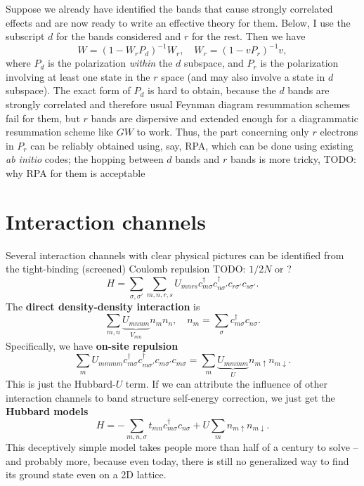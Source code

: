 \documentclass[hyperref, a4paper, 12pt]{report}
\newcommand*{\concept}[1]{{\textbf{#1}}}
\newcommand*{\abinitio}{\textit{ab initio}}
\begin{document}
Suppose we already have identified the bands that cause strongly correlated effects
and are now ready to write an effective theory for them.
Below, I use the subscript $d$ for the bands considered and $r$ for the rest.
Then we have\cite{aryasetiawan20117} 
\begin{equation}
    W = (1 - W_r P_d)^{-1} W_r, \quad 
    W_r = (1 - v P_r)^{-1}v,
\end{equation}
where $P_d$ is the polarization \emph{within} the $d$ subspace,
and $P_r$ is the polarization involving at least one state in the $r$ space 
(and may also involve a state in $d$ subspace).
The exact form of $P_d$ is hard to obtain,
because the $d$ bands are strongly correlated and therefore 
usual Feynman diagram resummation schemes fail for them,
but $r$ bands are dispersive and extended enough 
for a diagrammatic resummation scheme like $GW$ to work.
Thus, the part concerning only $r$ electrons in $P_r$ can be reliably 
obtained using, say, RPA, 
which can be done using existing \abinitio{} codes;
the hopping between $d$ bands and $r$ bands is more tricky,
TODO: why RPA for them is acceptable

\section{Interaction channels}

Several interaction channels with clear physical pictures 
can be identified from the tight-binding (screened) Coulomb repulsion
TODO: $1/2N$ or ?
\begin{equation}
    H = \sum_{\sigma, \sigma'} \sum_{m, n, r, s} 
    U_{mnrs} c^\dagger_{m \sigma} c^\dagger_{n \sigma'} c_{r \sigma'} c_{s \sigma'}.
\end{equation}
The \concept{direct density-density interaction} is 
\begin{equation}
    \sum_{m, n} \underbrace{U_{mnnm}}_{V_{mn}} n_m n_n, \quad n_m = \sum_\sigma c^\dagger_{m \sigma} c_{n \sigma}.
\end{equation}
Specifically, we have \concept{on-site repulsion}
\begin{equation}
    \sum_{m} U_{mmmm} c^\dagger_{m \sigma} c^\dagger_{m \sigma'} c_{m \sigma'} c_{m \sigma}
    = \sum_{m} \underbrace{U_{mmmm}}_U n_{m \uparrow} n_{m \downarrow}.
\end{equation}
This is just the Hubbard-$U$ term.
If we can attribute the influence of other interaction channels to
band structure self-energy correction,
we just get the \concept{Hubbard models}
\begin{equation}
    H = - \sum_{m, n, \sigma} t_{mn} c^\dagger_{m \sigma} c_{n \sigma}
    + U \sum_m n_{m \uparrow} n_{m \downarrow}.
\end{equation}
This deceptively simple model
takes people more than half of a century to solve 
-- and probably more, 
because even today, 
there is still no generalized way to find its ground state 
even on a 2D lattice.
\end{document}
